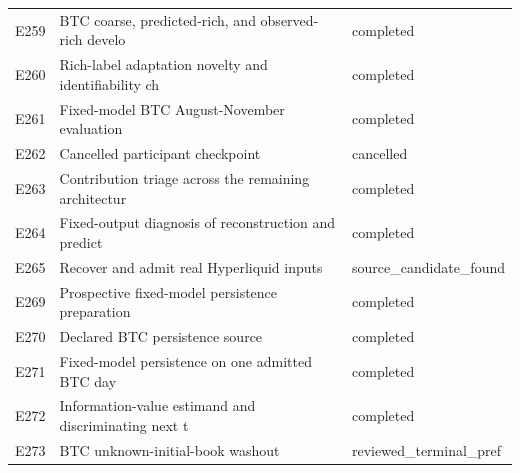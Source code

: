 \begin{longtable}{lp{7.6cm}l}
E259 & BTC coarse, predicted-rich, and observed-rich develo & completed \\
E260 & Rich-label adaptation novelty and identifiability ch & completed \\
E261 & Fixed-model BTC August-November evaluation & completed \\
E262 & Cancelled participant checkpoint & cancelled \\
E263 & Contribution triage across the remaining architectur & completed \\
E264 & Fixed-output diagnosis of reconstruction and predict & completed \\
E265 & Recover and admit real Hyperliquid inputs & source\_candidate\_found \\
E269 & Prospective fixed-model persistence preparation & completed \\
E270 & Declared BTC persistence source & completed \\
E271 & Fixed-model persistence on one admitted BTC day & completed \\
E272 & Information-value estimand and discriminating next t & completed \\
E273 & BTC unknown-initial-book washout & reviewed\_terminal\_pref \\
\end{longtable}
